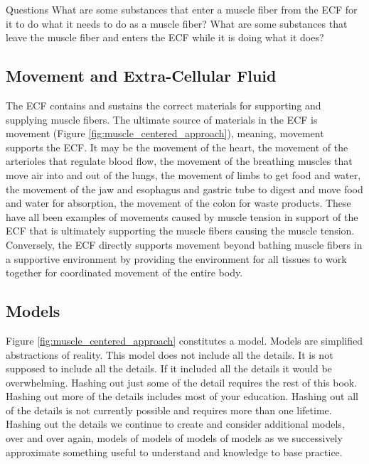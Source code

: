 \begin{question}{Questions}
What are some substances that enter a muscle fiber from the ECF for it to do what it needs to do as a muscle fiber? What are some substances that leave the muscle fiber and enters the ECF while it is doing what it does?
\end{question}

\subsection{Movement and Extra-Cellular Fluid}

The ECF contains and sustains the correct materials for supporting and supplying muscle fibers. The ultimate source of materials in the ECF is movement (Figure \ref{fig:muscle_centered_approach}), meaning, movement supports the ECF. It may be the movement of the heart, the movement of the arterioles that regulate blood flow, the movement of the breathing muscles that move air into and out of the lungs, the movement of limbs to get food and water, the movement of the jaw and esophagus and gastric tube to digest and move food and water for absorption, the movement of the colon for waste products. These have all been examples of movements caused by muscle tension in support of the ECF that is ultimately supporting the muscle fibers causing the muscle tension. Conversely, the ECF directly supports movement beyond bathing muscle fibers in a supportive environment by providing the environment for all tissues to work together for coordinated movement of the entire body.

\subsection{Models}

Figure \ref{fig:muscle_centered_approach} constitutes a model. Models are simplified abstractions of reality. This model does not include all the details. It is not supposed to include all the details. If it included all the details it would be overwhelming. Hashing out just some of the detail requires the rest of this book. Hashing out more of the details includes most of your education. Hashing out all of the details is not currently possible and requires more than one lifetime.\footnotemark{} Hashing out the details we continue to create and consider additional models, over and over again, models of models of models of models as we successively approximate something useful to understand and knowledge to base practice.

